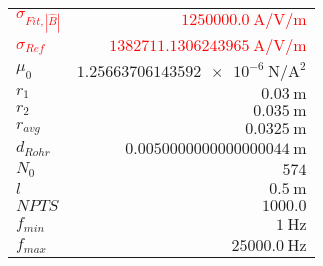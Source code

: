 
{%
    \begin{center}
    \label{tab:fitparams:st:freq:approx}
    \begin{tabular}{lr}
    \toprule
        \textcolor{red}{$\sigma_{Fit,|\hat{B}|}$} & \textcolor{red}{$\SI{1250000.0}{\ampere\per\volt\per\meter}$}\\
        \textcolor{red}{$\sigma_{Ref}$} & \textcolor{red}{$\SI{1382711.1306243965}{\ampere\per\volt\per\meter}$}\\
        $\mu_0$ & $\SI{1.25663706143592e-6}{\newton\per\ampere\squared}$\\
        $r_1$ & $\SI{0.03}{\meter}$\\
        $r_2$ & $\SI{0.035}{\meter}$\\
        $r_{avg}$ & $\SI{0.0325}{\meter}$\\
        $d_{Rohr}$ & $\SI{0.0050000000000000044}{\meter}$\\
        $N_0$ & $\num{574}$\\
        $l$ & $\SI{0.5}{\meter}$\\
        $NPTS$ & $\num{1000.0}$\\
        $f_{min}$ & $\SI{1}{\hertz}$\\
        $f_{max}$ & $\SI{25000.0}{\hertz}$\\

    \bottomrule
    \end{tabular}
    \end{center}
}

